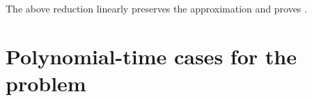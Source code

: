 		The above reduction linearly preserves the approximation and proves .

%

	\section{Polynomial-time cases for the \mwccs{} problem}
	\label{sec:poly}

